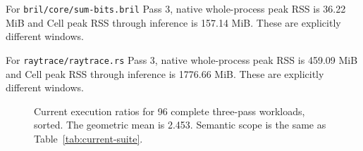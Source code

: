 For \texttt{bril/core/sum-bits.bril} Pass 3, native whole-process peak RSS is 36.22 MiB and Cell peak RSS through inference is 157.14 MiB. These are explicitly different windows.

For \texttt{raytrace/raytrace.rs} Pass 3, native whole-process peak RSS is 459.09 MiB and Cell peak RSS through inference is 1776.66 MiB. These are explicitly different windows.

\begin{figure}[ht]\centering{}

\caption{Current execution ratios for 96 complete three-pass workloads, sorted. The geometric mean is 2.453. Semantic scope is the same as Table~\ref{tab:current-suite}.}\label{fig:current-dist}\end{figure}
